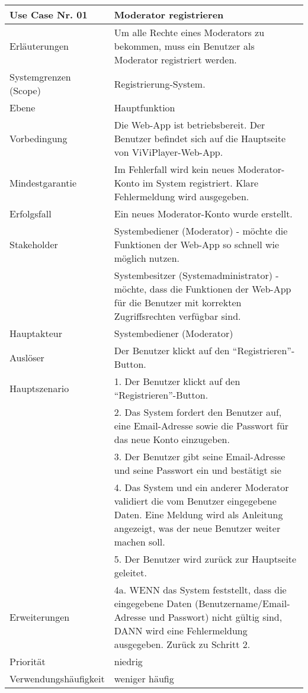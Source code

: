 \begin{tabularx}{\linewidth}{|l|X|}
	\hline
	Use Case Nr. 01			& \textbf{Moderator registrieren} \\ \hline
	Erläuterungen			& Um alle Rechte eines Moderators zu bekommen, muss ein 
							Benutzer als Moderator registriert werden. \\ \hline
	Systemgrenzen (Scope)	& Registrierung-System. \\ \hline
	Ebene					& Hauptfunktion \\ \hline
	Vorbedingung			& Die Web-App ist betriebsbereit. Der Benutzer befindet sich auf die 
							  Hauptseite von ViViPlayer-Web-App. \\ \hline
	Mindestgarantie			& Im Fehlerfall wird kein neues Moderator-Konto im System 
	                          registriert. Klare Fehlermeldung wird ausgegeben. \\ \hline
	Erfolgsfall  			& Ein neues Moderator-Konto wurde erstellt. \\ \hline
	Stakeholder				& Systembediener (Moderator) - möchte die Funktionen der Web-App so 
							  schnell wie möglich nutzen. \\
							& Systembesitzer (Systemadministrator) - möchte, dass die Funktionen 
							  der Web-App für die Benutzer mit korrekten Zugriffsrechten verfügbar sind.\\ \hline
	Hauptakteur				& Systembediener (Moderator) \\ \hline
	Auslöser				& Der Benutzer klickt auf den ``Registrieren''-Button. \\ \hline	
	Hauptszenario			& 1. Der Benutzer klickt auf den ``Registrieren''-Button. \\
							& 2. Das System fordert den Benutzer auf, eine Email-Adresse 
							  sowie die Passwort für das neue Konto einzugeben. \\
							& 3. Der Benutzer gibt seine Email-Adresse und seine Passwort 
							  ein und bestätigt sie \\
							& 4. Das System und ein anderer Moderator validiert die vom 
							  Benutzer eingegebene Daten. Eine Meldung wird als 
							  Anleitung angezeigt, was der neue Benutzer weiter machen soll. \\
							& 5. Der Benutzer wird zurück zur Hauptseite geleitet. 
							  \\ \hline
	Erweiterungen			& 4a. WENN das System feststellt, dass die eingegebene Daten 
							  (Benutzername/Email-Adresse und Passwort) nicht gültig sind, DANN wird eine Fehlermeldung ausgegeben. Zurück zu Schritt 2. \\ \hline
	Priorität				& niedrig \\ \hline
	Verwendungshäufigkeit	& weniger häufig \\ \hline
\end{tabularx}
